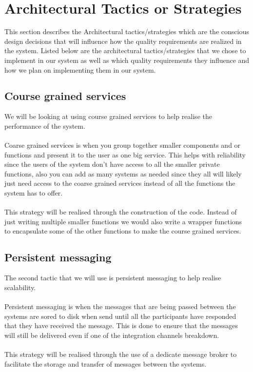\documentclass[a4paper]{article}
\begin{document}
\section{Architectural Tactics or Strategies}
This section describes the Architectural tactics/strategies which are the conscious design decisions that will influence how the quality requirements are realized in the system. Listed below are the architectural tactics/strategies that we chose to implement in our system as well as which quality requirements they influence and how we plan on implementing them in our system. 

\subsection{Course grained services}
We will be looking at using course grained services to help realise the performance of the system. 
\\
\\Coarse grained services is when you group together smaller components and or functions and present it to the user as one big service. This helps with reliability since the users of the system don’t have access to all the smaller private functions, also you can add as many systems as needed since they all will likely just need access to the coarse grained services instead of all the functions the system has to offer.
\\
\\This strategy will be realised through the construction of the code. Instead of just writing multiple smaller functions we would also write a wrapper functions to encapsulate some of the other functions to make the course grained services. 
\\
\subsection{Persistent messaging}
The second tactic that we will use is persistent messaging to help realise scalability. 
\\
\\Persistent messaging is when the messages that are being passed between the systems are sored to disk when send until all the participants have responded that they have received the message. This is done to ensure that the messages will still be delivered even if one of the integration channels breakdown.
\\
\\This strategy will be realised through the use of a dedicate message broker to facilitate the storage and transfer of messages between the systems. 
\\
\end{document}
